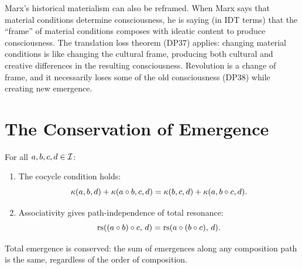 Marx's historical materialism can also be reframed.  When Marx says that
material conditions determine consciousness, he is saying (in IDT terms) that
the ``frame'' of material conditions composes with ideatic content to produce
consciousness.  The translation loss theorem (DP37) applies: changing material
conditions is like changing the cultural frame, producing both cultural and
creative differences in the resulting consciousness.  Revolution is a
change of frame, and it necessarily loses some of the old consciousness
(DP38) while creating new emergence.

\section{The Conservation of Emergence}

\begin{theorem}
\label{thm:emergence-conservation}
For all $a, b, c, d \in \mathcal{I}$:
\begin{enumerate}
\item The cocycle condition holds:
\[
\kappa(a, b, d) + \kappa(a \circ b, c, d)
= \kappa(b, c, d) + \kappa(a, b \circ c, d).
\]
\item Associativity gives path-independence of total resonance:
\[
\mathrm{rs}((a \circ b) \circ c,\, d) = \mathrm{rs}(a \circ (b \circ c),\, d).
\]
\end{enumerate}
Total emergence is conserved: the sum of emergences along any composition
path is the same, regardless of the order of composition.
\end{theorem}

